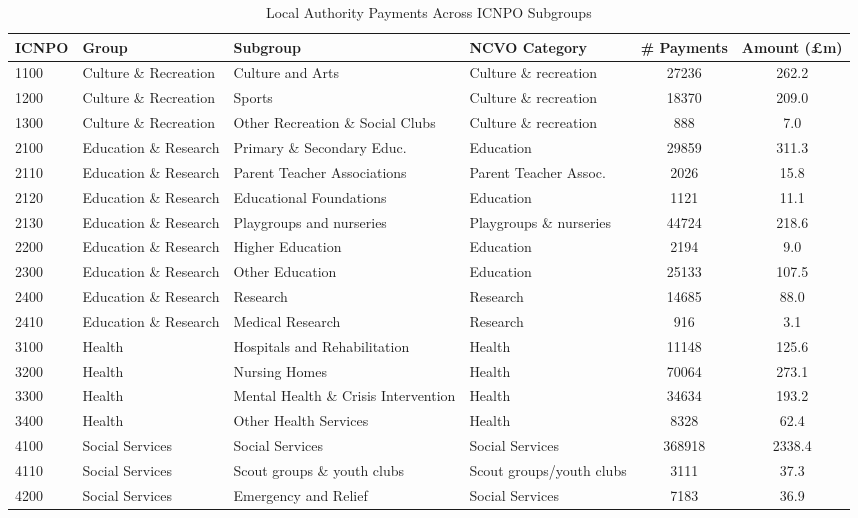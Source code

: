 \documentclass[12pt]{article}
\begin{document}
\begin{table}[!t]
\centering
\caption{Local Authority Payments Across ICNPO Subgroups}
\label{subgrouptable}
\scriptsize
\begin{tabular}{llllcc}\toprule
ICNPO & Group & Subgroup & NCVO Category  &\# Payments & Amount (£m) \\ \midrule
1100  & Culture \& Recreation & Culture and Arts & Culture \& recreation & 27236 & 262.2 \\
1200  & Culture \& Recreation & Sports & Culture \& recreation & 18370 & 209.0 \\
1300  & Culture \& Recreation  & Other Recreation \& Social Clubs & Culture \& recreation  & 888 & 7.0 \\
2100  & Education \& Research & Primary \& Secondary Educ. & Education & 29859 & 311.3 \\
2110  & Education \& Research & Parent Teacher Associations & Parent Teacher Assoc.  & 2026 & 15.8 \\
2120  & Education \& Research & Educational Foundations  & Education  & 1121 & 11.1 \\
2130  & Education \& Research & Playgroups and nurseries & Playgroups \& nurseries   & 44724  & 218.6   \\	
2200  & Education \& Research & Higher Education  & Education  & 2194 & 9.0  \\
2300  & Education \& Research & Other Education & Education  & 25133  & 107.5   \\
2400  & Education \& Research & Research   & Research   & 14685  & 88.0 \\
2410  & Education \& Research & Medical Research  & Research   & 916  & 3.1  \\
3100  & Health & Hospitals and Rehabilitation & Health   & 11148  & 125.6   \\
3200  & Health & Nursing Homes   & Health   & 70064  & 273.1   \\
3300  & Health & Mental Health \& Crisis Intervention  & Health   & 34634  & 193.2   \\
3400  & Health & Other Health Services  & Health   & 8328 & 62.4 \\
4100  & Social Services & Social Services & Social Services  & 368918 & 2338.4  \\
4110  & Social Services & Scout groups \& youth clubs & Scout groups/youth clubs & 3111 & 37.3 \\
4200  & Social Services & Emergency and Relief   & Social Services  & 7183 & 36.9 \\

\end{tabular}
\end{table}
\end{document}
